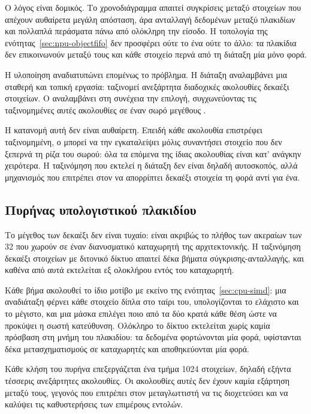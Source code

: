 Ο λόγος είναι δομικός. Το χρονοδιάγραμμα απαιτεί συγκρίσεις μεταξύ στοιχείων που
απέχουν αυθαίρετα μεγάλη απόσταση, άρα ανταλλαγή δεδομένων μεταξύ πλακιδίων και
πολλαπλά περάσματα πάνω από ολόκληρη την είσοδο. Η τοπολογία της
ενότητας~\ref{sec:npu-objectfifo} δεν προσφέρει ούτε το ένα ούτε το άλλο: τα
πλακίδια δεν επικοινωνούν μεταξύ τους και κάθε στοιχείο περνά από τη διάταξη μία
μόνο φορά.

Η υλοποίηση αναδιατυπώνει επομένως το πρόβλημα. Η διάταξη αναλαμβάνει μια
σταθερή και τοπική εργασία: ταξινομεί ανεξάρτητα διαδοχικές ακολουθίες
δεκαέξι στοιχείων. Ο  αναλαμβάνει στη συνέχεια την επιλογή, συγχωνεύοντας
τις ταξινομημένες αυτές ακολουθίες σε έναν σωρό μεγέθους .

Η κατανομή αυτή δεν είναι αυθαίρετη. Επειδή κάθε ακολουθία επιστρέφει
ταξινομημένη, ο  μπορεί να την εγκαταλείψει μόλις συναντήσει στοιχείο
που δεν ξεπερνά τη ρίζα του σωρού: όλα τα επόμενα της ίδιας ακολουθίας είναι
κατ' ανάγκην χειρότερα. Η ταξινόμηση που εκτελεί η διάταξη δεν είναι δηλαδή
αυτοσκοπός, αλλά μηχανισμός που επιτρέπει στον  να απορρίπτει δεκαέξι
στοιχεία τη φορά αντί για ένα.

\subsection{Πυρήνας υπολογιστικού πλακιδίου}
\label{sec:npu-bitonic-kernel}

Το μέγεθος των δεκαέξι δεν είναι τυχαίο: είναι ακριβώς το πλήθος των ακεραίων
των 32  που χωρούν σε έναν διανυσματικό καταχωρητή της αρχιτεκτονικής. Η
ταξινόμηση δεκαέξι στοιχείων με διτονικό δίκτυο απαιτεί δέκα βήματα
σύγκρισης-ανταλλαγής, και καθένα από αυτά εκτελείται εξ ολοκλήρου εντός του
καταχωρητή.

Κάθε βήμα ακολουθεί το ίδιο μοτίβο με εκείνο της ενότητας~\ref{sec:cpu-simd}: μια
αναδιάταξη φέρνει κάθε στοιχείο δίπλα στο ταίρι του, υπολογίζονται το ελάχιστο
και το μέγιστο, και μια μάσκα επιλέγει ποιο από τα δύο κρατά κάθε θέση ώστε να
προκύψει η σωστή κατεύθυνση. Ολόκληρο το δίκτυο εκτελείται χωρίς καμία πρόσβαση
στη μνήμη του πλακιδίου: τα δεδομένα φορτώνονται μία φορά, υφίστανται δέκα
μετασχηματισμούς σε καταχωρητές και αποθηκεύονται μία φορά.

Κάθε κλήση του πυρήνα επεξεργάζεται ένα τμήμα 1024 στοιχείων, δηλαδή εξήντα
τέσσερις ανεξάρτητες ακολουθίες. Οι ακολουθίες αυτές δεν έχουν καμία εξάρτηση
μεταξύ τους, γεγονός που επιτρέπει στον μεταγλωττιστή να τις διοχετεύσει και να
καλύψει τις καθυστερήσεις των επιμέρους εντολών.

